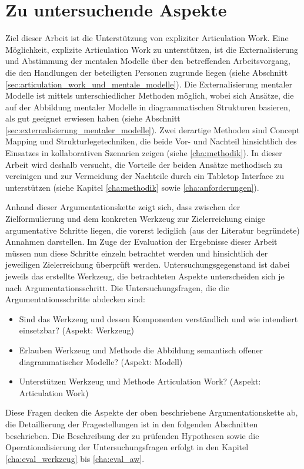 \section{Zu untersuchende Aspekte} %
\label{sec:untersuchungsaspekte}

Ziel dieser Arbeit ist die Unterstützung von expliziter Articulation Work. Eine Möglichkeit, explizite Articulation Work zu unterstützen, ist die Externalisierung und Abstimmung der mentalen Modelle über den betreffenden Arbeitsvorgang, die den Handlungen der beteiligten Personen zugrunde liegen (siehe Abschnitt \ref{sec:articulation_work_und_mentale_modelle}). Die Externalisierung mentaler Modelle ist mittels unterschiedlicher Methoden möglich, wobei sich Ansätze, die auf der Abbildung mentaler Modelle in diagrammatischen Strukturen basieren, als gut geeignet erwiesen haben (siehe Abschnitt \ref{sec:externalisierung_mentaler_modelle}). Zwei derartige Methoden sind Concept Mapping und Strukturlegetechniken, die beide Vor- und Nachteil hinsichtlich des Einsatzes in kollaborativen Szenarien zeigen (siehe \ref{cha:methodik}). In dieser Arbeit wird deshalb versucht, die Vorteile der beiden Ansätze methodisch zu vereinigen und zur Vermeidung der Nachteile durch ein Tabletop Interface zu unterstützen (siehe Kapitel \ref{cha:methodik} sowie \ref{cha:anforderungen}).

Anhand dieser Argumentationskette zeigt sich, dass zwischen der Zielformulierung und dem konkreten Werkzeug zur Zielerreichung einige argumentative Schritte liegen, die vorerst lediglich (aus der Literatur begründete) Annahmen darstellen. Im Zuge der Evaluation der Ergebnisse dieser Arbeit müssen nun diese Schritte einzeln betrachtet werden und hinsichtlich der jeweiligen Zielerreichung überprüft werden. Untersuchungsgegenstand ist dabei jeweils das erstellte Werkzeug, die betrachteten Aspekte unterscheiden sich je nach Argumentationsschritt. Die Untersuchungsfragen, die die Argumentationsschritte abdecken sind:
\begin{itemize}
 \item Sind das Werkzeug und dessen Komponenten verständlich und wie intendiert einsetzbar? (Aspekt: Werkzeug)
 \item Erlauben Werkzeug und Methode die Abbildung semantisch offener diagrammatischer Modelle? (Aspekt: Modell)
 \item Unterstützen Werkzeug und Methode Articulation Work? (Aspekt: Articulation Work)
\end{itemize}

Diese Fragen decken die Aspekte der oben beschriebene Argumentationskette ab, die Detaillierung der Fragestellungen ist in den folgenden Abschnitten beschrieben. Die Beschreibung der zu prüfenden Hypothesen sowie die Operationalisierung der Untersuchungsfragen erfolgt in den Kapitel \ref{cha:eval_werkzeug} bis \ref{cha:eval_aw}.


